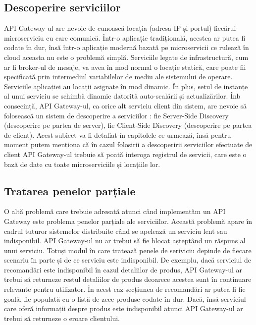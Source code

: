\documentclass[12pt, a4paper, oneside, romanian]{teza-upb}
\begin{document}
\subsection{Descoperire serviciilor}

API Gateway-ul are nevoie de cunoască locația (adresa IP și portul) fiecărui microserviciu cu care comunică. Într-o aplicație tradițională, acestea ar putea fi codate în dur, însă într-o aplicație modernă bazată pe microservicii ce rulează în cloud aceasta nu este o problemă simplă. Serviciile legate de infrastructură, cum ar fi broker-ul de mesaje, va avea în mod normal o locație statică, care poate fii specificată prin intermediul variabilelor de mediu ale sistemului de operare. Serviciile aplicației au locații asignate în mod dinamic. În plus, setul de instanțe al unui serviciu se schimbă dinamic datorită auto-scalării și actualizărilor. Înb consecință, API Gateway-ul, ca orice alt serviciu client din sistem, are nevoie să folosească un sistem de descoperire a serviciilor : fie Server-Side Discovery (descoperire pe partea de server), fie Client-Side Discovery (descoperire pe partea de client). Acest subiect va fi detaliat în capitolele ce urmează, însă pentru moment putem menționa că în cazul folosirii a descoperirii serviciilor efectuate de client API Gateway-ul trebuie să poată interoga registrul de servicii, care este o bază de date cu toate microserviciile și locațiile lor. 

\subsection{Tratarea penelor parțiale}

O altă problemă care trebuie adresată atunci când implementăm un API Gateway este problema penelor parțiale ale serviciilor. Această problemă apare în cadrul tuturor sistemelor distribuite când se apelează un serviciu lent sau indisponibil. API Gateway-ul nu ar trebui să fie blocat așteptând un răspuns al unui serviciu. Totuși modul în care tratează penele de seriviciu depinde de fiecare scenariu în parte și de ce serviciu este indisponibil. De exemplu, dacă serviciul de recomandări este indisponibil în cazul detaliilor de produs, API Gateway-ul ar trebui să returneze restul detaliilor de produs deoarece acestea sunt în continuare relevante pentru utilizator. În acest caz secțiunea de recomandări ar putea fi fie goală, fie populată cu o listă de zece produse codate în dur. Dacă, însă serviciul care oferă informații despre produs este indisponibil atunci API Gateway-ul ar trebui să returneze o eroare clientului.
\end{document}
